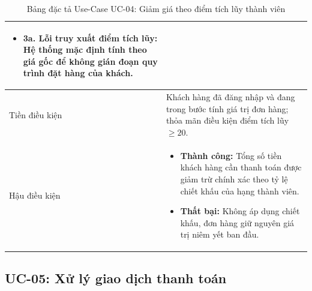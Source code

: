 \documentclass[12pt,a4paper]{article}
\begin{document}
\begin{table}[H]
\begin{tabularx}{\textwidth}{|>{\bfseries\raggedright\arraybackslash}p{3.2cm}|>{\raggedright\arraybackslash}X|}
\begin{itemize}[leftmargin=*,itemsep=2pt,topsep=2pt,parsep=0pt,partopsep=0pt]
    \item \textbf{3a. Lỗi truy xuất điểm tích lũy:} Hệ thống mặc định tính theo giá gốc để không gián đoạn quy trình đặt hàng của khách.
\end{itemize} \\
\hline
Tiền điều kiện & Khách hàng đã đăng nhập và đang trong bước tính giá trị đơn hàng; thỏa mãn điều kiện điểm tích lũy $\ge 20$. \\
\hline
Hậu điều kiện & 
\begin{itemize}[leftmargin=*,itemsep=2pt,topsep=2pt,parsep=0pt,partopsep=0pt]
    \item \textbf{Thành công:} Tổng số tiền khách hàng cần thanh toán được giảm trừ chính xác theo tỷ lệ chiết khấu của hạng thành viên.
    \item \textbf{Thất bại:} Không áp dụng chiết khấu, đơn hàng giữ nguyên giá trị niêm yết ban đầu.
\end{itemize} \\
\hline
\end{tabularx}
\caption{Bảng đặc tả Use-Case UC-04: Giảm giá theo điểm tích lũy thành viên}
\label{tab:uc-04}
\end{table}

\subsection{UC-05: Xử lý giao dịch thanh toán}
\end{document}
